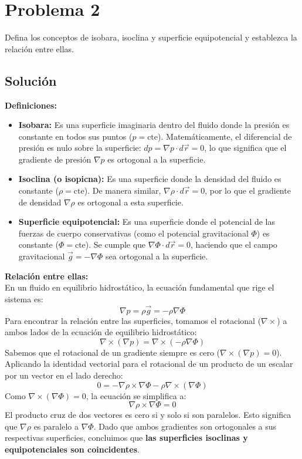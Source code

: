 \documentclass[a4paper]{article}
\begin{document}
\section{Problema 2}

Defina los conceptos de isobara, isoclina y superficie equipotencial y establezca la relación entre ellas.



\subsection{Solución}

\textbf{Definiciones:}
\begin{itemize}
    \item \textbf{Isobara:} Es una superficie imaginaria dentro del fluido donde la presión es constante en todos sus puntos ($p = \text{cte}$). Matemáticamente, el diferencial de presión es nulo sobre la superficie: $dp = \nabla p \cdot d\vec{r} = 0$, lo que significa que el gradiente de presión $\nabla p$ es ortogonal a la superficie.
    \item \textbf{Isoclina (o isopicna):} Es una superficie donde la densidad del fluido es constante ($\rho = \text{cte}$). De manera similar, $\nabla \rho \cdot d\vec{r} = 0$, por lo que el gradiente de densidad $\nabla \rho$ es ortogonal a esta superficie.
    \item \textbf{Superficie equipotencial:} Es una superficie donde el potencial de las fuerzas de cuerpo conservativas (como el potencial gravitacional $\Phi$) es constante ($\Phi = \text{cte}$). Se cumple que $\nabla \Phi \cdot d\vec{r} = 0$, haciendo que el campo gravitacional $\vec{g} = -\nabla \Phi$ sea ortogonal a la superficie.
\end{itemize}

\textbf{Relación entre ellas:} \\
En un fluido en equilibrio hidrostático, la ecuación fundamental que rige el sistema es:
$$ \nabla p = \rho \vec{g} = -\rho \nabla \Phi $$
Para encontrar la relación entre las superficies, tomamos el rotacional ($\nabla \times$) a ambos lados de la ecuación de equilibrio hidrostático:
$$ \nabla \times (\nabla p) = \nabla \times (-\rho \nabla \Phi) $$
Sabemos que el rotacional de un gradiente siempre es cero ($\nabla \times (\nabla p) = 0$). Aplicando la identidad vectorial para el rotacional de un producto de un escalar por un vector en el lado derecho:
$$ 0 = -\nabla \rho \times \nabla \Phi - \rho \nabla \times (\nabla \Phi) $$
Como $\nabla \times (\nabla \Phi) = 0$, la ecuación se simplifica a:
$$ \nabla \rho \times \nabla \Phi = 0 $$
El producto cruz de dos vectores es cero si y solo si son paralelos. Esto significa que $\nabla \rho$ es paralelo a $\nabla \Phi$. Dado que ambos gradientes son ortogonales a sus respectivas superficies, concluimos que \textbf{las superficies isoclinas y equipotenciales son coincidentes}.
\end{document}
